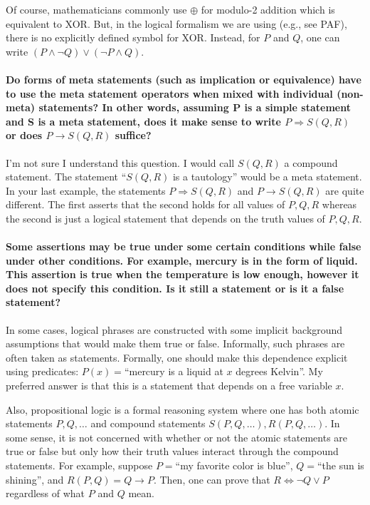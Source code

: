 \documentclass[10pt,english]{article}
\begin{document}
Of course, mathematicians commonly use $\oplus$ for modulo-2 addition which is equivalent to XOR.  But, in the logical formalism we are using (e.g., see PAF), there is no explicitly defined symbol for XOR.  Instead, for $P$ and $Q$, one can write $(P \wedge \neg Q) \vee (\neg P \wedge Q)$.

\paragraph{Do forms of meta statements (such as implication or equivalence) have to use the meta statement operators when mixed with individual (non-meta) statements? In other words, assuming P is a simple statement and S is a meta statement, does it make sense to write $P \Rightarrow S(Q,R)$ or does $P \rightarrow S(Q,R)$ suffice?}

I'm not sure I understand this question.  I would call $S(Q,R)$ a compound statement.  The statement ``$S(Q,R)$ is a tautology'' would be a meta statement.  In your last example, the statements $P \Rightarrow S(Q,R)$ and $P \rightarrow S(Q,R)$ are quite different.  The first asserts that the second holds for all values of $P,Q,R$ whereas the second is just a logical statement that depends on the truth values of $P,Q,R$.

\paragraph{Some assertions may be true under some certain conditions while false under other conditions. For example, mercury is in the form of liquid. This assertion is true when the temperature is low enough, however it does not specify this condition. Is it still a statement or is it a false statement?}

In some cases, logical phrases are constructed with some implicit background assumptions that would make them true or false.  Informally, such phrases are often taken as statements. Formally, one should make this dependence explicit using predicates: $P(x)=$``mercury is a liquid at $x$ degrees Kelvin''.  My preferred answer is that this is a statement that depends on a free variable $x$.  

Also, propositional logic is a formal reasoning system where one has both atomic statements $P,Q,\ldots$ and compound statements $S(P,Q,\ldots), R(P,Q,\ldots)$.  In some sense, it is not concerned with whether or not the atomic statements are true or false but only how their truth values interact through the compound statements.  For example, suppose $P=$``my favorite color is blue'', $Q=$``the sun is shining'', and $R(P,Q) = Q \rightarrow P$.  Then, one can prove that $R \Leftrightarrow \neg Q \vee P$ regardless of what $P$ and $Q$ mean.
\end{document}
